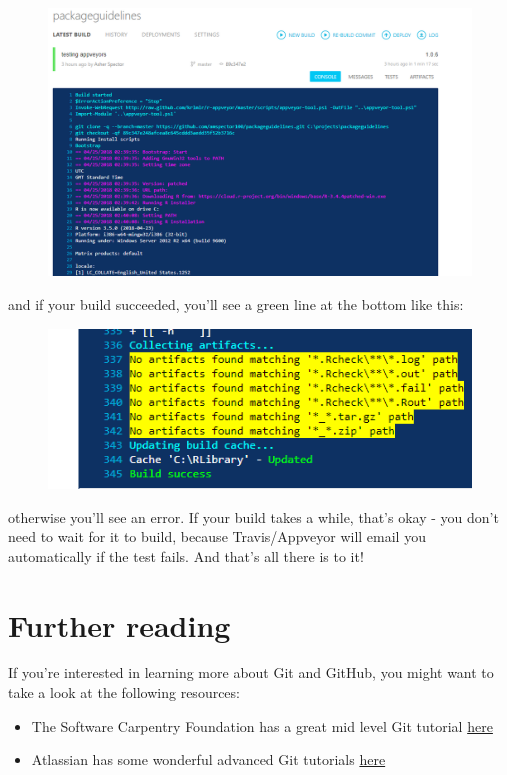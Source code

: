 \documentclass[]{book}
\begin{document}
\begin{figure}
\centering
\includegraphics{images/testSS/appveyor2.PNG}
\caption{}
\end{figure}

and if your build succeeded, you'll see a green line at the bottom like
this:

\begin{figure}
\centering
\includegraphics{images/testSS/appveyor3.PNG}
\caption{}
\end{figure}

otherwise you'll see an error. If your build takes a while, that's okay
- you don't need to wait for it to build, because Travis/Appveyor will
email you automatically if the test fails. And that's all there is to
it!

\section{Further reading}\label{further-reading}

If you're interested in learning more about Git and GitHub, you might
want to take a look at the following resources:

\begin{itemize}
\item
  The Software Carpentry Foundation has a great mid level Git tutorial
  \href{https://swcarpentry.GitHub.io/git-novice/}{here}
\item
  Atlassian has some wonderful advanced Git tutorials
  \href{https://www.atlassian.com/git/tutorials/advanced-overview}{here}
\end{itemize}
\end{document}
